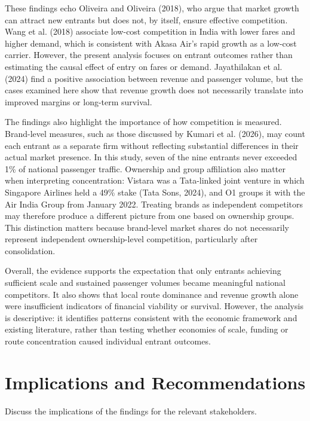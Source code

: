 \documentclass[12pt,a4paper]{article}
\newenvironment{o3box}{\ifthenelse{\boolean{o3highlight}}{\begingroup\color{o3sky}}{}}{\ifthenelse{\boolean{o3highlight}}{\endgroup}{}}
\begin{document}
\begin{o3box}
These findings echo Oliveira and Oliveira (2018), who argue that market growth can attract new entrants but does not, by itself, ensure effective competition. Wang et al. (2018) associate low-cost competition in India with lower fares and higher demand, which is consistent with Akasa Air's rapid growth as a low-cost carrier. However, the present analysis focuses on entrant outcomes rather than estimating the causal effect of entry on fares or demand. Jayathilakan et al. (2024) find a positive association between revenue and passenger volume, but the cases examined here show that revenue growth does not necessarily translate into improved margins or long-term survival.

The findings also highlight the importance of how competition is measured. Brand-level measures, such as those discussed by Kumari et al. (2026), may count each entrant as a separate firm without reflecting substantial differences in their actual market presence. In this study, seven of the nine entrants never exceeded 1\% of national passenger traffic. Ownership and group affiliation also matter when interpreting concentration: Vistara was a Tata-linked joint venture in which Singapore Airlines held a 49\% stake (Tata Sons, 2024), and O1 groups it with the Air India Group from January 2022. Treating brands as independent competitors may therefore produce a different picture from one based on ownership groups. This distinction matters because brand-level market shares do not necessarily represent independent ownership-level competition, particularly after consolidation.

Overall, the evidence supports the expectation that only entrants achieving sufficient scale and sustained passenger volumes became meaningful national competitors. It also shows that local route dominance and revenue growth alone were insufficient indicators of financial viability or survival. However, the analysis is descriptive: it identifies patterns consistent with the economic framework and existing literature, rather than testing whether economies of scale, funding or route concentration caused individual entrant outcomes.



\end{o3box}

\section{Implications and Recommendations}
Discuss the implications of the findings for the relevant stakeholders.
\end{document}

